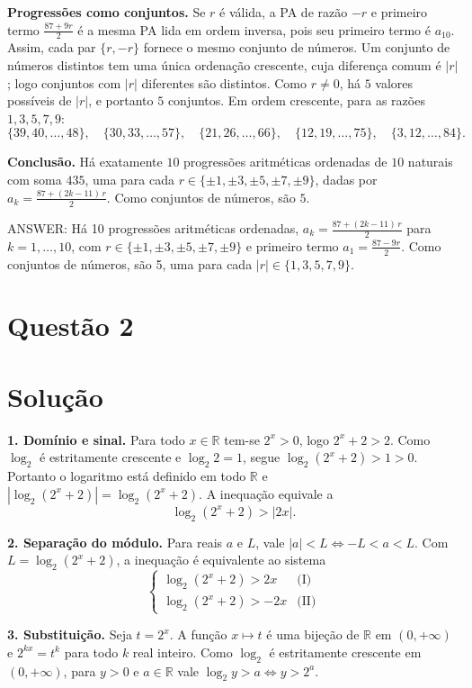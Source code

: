 \documentclass{article}%
\begin{document}
\textbf{Progressões como conjuntos.} Se $r$ é válida, a PA de razão $-r$ e primeiro termo $\frac{87 + 9r}{2}$ é a mesma PA lida em ordem inversa, pois seu primeiro termo é $a_{10}$. Assim, cada par $\{r, -r\}$ fornece o mesmo conjunto de números. Um conjunto de números distintos tem uma única ordenação crescente, cuja diferença comum é $|r|$; logo conjuntos com $|r|$ diferentes são distintos. Como $r \neq 0$, há $5$ valores possíveis de $|r|$, e portanto $5$ conjuntos. Em ordem crescente, para as razões $1, 3, 5, 7, 9$:
\[
\{39, 40, \ldots, 48\}, \quad \{30, 33, \ldots, 57\}, \quad \{21, 26, \ldots, 66\}, \quad \{12, 19, \ldots, 75\}, \quad \{3, 12, \ldots, 84\}.
\]

\textbf{Conclusão.} Há exatamente $10$ progressões aritméticas ordenadas de $10$ naturais com soma $435$, uma para cada $r \in \{\pm 1, \pm 3, \pm 5, \pm 7, \pm 9\}$, dadas por $a_k = \frac{87 + (2k-11)\,r}{2}$. Como conjuntos de números, são $5$.

ANSWER: Há 10 progressões aritméticas ordenadas, $a_k = \frac{87 + (2k-11)\,r}{2}$ para $k = 1, \ldots, 10$, com $r \in \{\pm 1, \pm 3, \pm 5, \pm 7, \pm 9\}$ e primeiro termo $a_1 = \frac{87 - 9r}{2}$. Como conjuntos de números, são 5, uma para cada $|r| \in \{1, 3, 5, 7, 9\}$.%
\newpage%
\section*{Questão 2}

\section*{Solução}

\textbf{1. Domínio e sinal.} Para todo $x\in\mathbb{R}$ tem-se $2^x>0$, logo $2^x+2>2$. Como $\log_2$ é estritamente crescente e $\log_2 2=1$, segue $\log_2(2^x+2)>1>0$. Portanto o logaritmo está definido em todo $\mathbb{R}$ e $\left|\log_2(2^x+2)\right|=\log_2(2^x+2)$. A inequação equivale a
\[
\log_2(2^x+2)>|2x|.
\]

\textbf{2. Separação do módulo.} Para reais $a$ e $L$, vale $|a|<L \iff -L<a<L$. Com $L=\log_2(2^x+2)$, a inequação é equivalente ao sistema
\[
\begin{cases}
\log_2(2^x+2)>2x & \text{(I)}\\
\log_2(2^x+2)>-2x & \text{(II)}
\end{cases}
\]

\textbf{3. Substituição.} Seja $t=2^x$. A função $x\mapsto t$ é uma bijeção de $\mathbb{R}$ em $(0,+\infty)$ e $2^{kx}=t^k$ para todo $k$ real inteiro. Como $\log_2$ é estritamente crescente em $(0,+\infty)$, para $y>0$ e $a\in\mathbb{R}$ vale $\log_2 y>a\iff y>2^a$.
\end{document}

